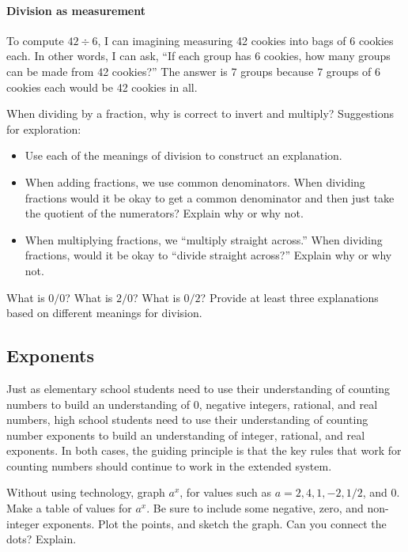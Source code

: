 \documentclass[space,nooutcomes]{ximera}
\begin{document}
\paragraph{Division as measurement}  To compute  $42\div 6$, I can imagining measuring 42 cookies into bags of 6 cookies each.  In other words, I can ask, ``If each group has 6 cookies, how many groups can be made from 42 cookies?''  The answer is 7 groups  because 7 groups of 6 cookies each would be 42 cookies in all.   

\begin{problem}
When dividing by a fraction, why is correct to invert and multiply?  Suggestions for exploration: 
\begin{itemize}
\item Use each of the meanings of division to construct an explanation.  
\item When adding fractions, we use common denominators.  When dividing fractions would it be okay to get a common denominator and then just take the quotient of the numerators?  Explain why or why not.  
\item When multiplying fractions, we ``multiply straight across.''  When dividing fractions, would it be okay to ``divide straight across?''  Explain why or why not.  
\end{itemize}
\end{problem}

\begin{problem}
What is $0/0$?  What is $2/0$?  What is $0/2$?  Provide at least three explanations based on different meanings for division.  
\end{problem}

\subsection*{Exponents}
Just as elementary school students need to use their understanding of counting numbers to build an understanding of 0, negative integers, rational, and real numbers, high school students need to use their understanding of counting number exponents to build an understanding of integer, rational, and real exponents.  In both cases, the guiding principle is that the key rules that work for counting numbers should continue to work in the extended system.

\begin{problem}
Without using technology, graph $a^x$, for values such as $a = 2, 4, 1, -2, 1/2$, and $0$.  Make a table of values for $a^x$.  Be sure to include some negative, zero, and non-integer exponents.  Plot the points, and sketch the graph.  Can you connect the dots?  Explain.  
\end{problem}
\end{document}
